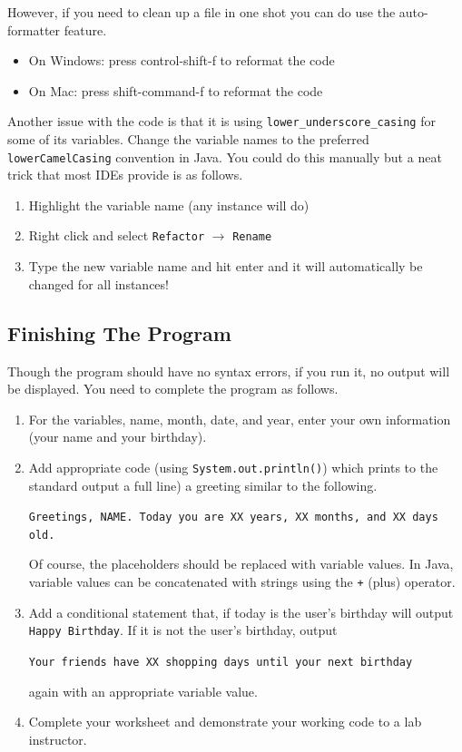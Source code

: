 \documentclass[12pt]{scrartcl}
\begin{document}
However, if you need to clean up a file in one shot you can do use the
auto-formatter feature.  

\begin{itemize}
  \item On Windows: press control-shift-f to reformat the code
  \item On Mac: press shift-command-f to reformat the code
\end{itemize}

Another issue with the code is that it is using \texttt{lower_underscore_casing} for some of its variables.  Change the 
variable names to the preferred \texttt{lowerCamelCasing} 
convention in Java.  You could do this manually but a neat trick that
most IDEs provide is as follows.

\begin{enumerate}
  \item Highlight the variable name (any instance will do)
  \item Right click and select \texttt{Refactor} $\rightarrow$ \texttt{Rename}
  \item Type the new variable name and hit enter and it will automatically be changed for all instances!  
\end{enumerate}

\subsection{Finishing The Program}

Though the program should have no syntax errors, if you run it, no 
output will be displayed.  You need to complete the program as follows.

\begin{enumerate}
  \item For the variables, name, month, date, and year, enter your 
  	own information (your name and your birthday).
  \item Add appropriate code (using \texttt{System.out.println()})
    which prints to the standard output a full line) a greeting similar
    to the following. 
    
    \texttt{Greetings, NAME.  Today you are XX years, 
    XX months, and XX days old.}  
    
    Of course, the placeholders should
    be replaced with variable values.  In Java, variable values can be
    concatenated with strings using the \texttt{+} (plus) 
    operator.
  \item Add a conditional statement that, if today is the user's birthday 
    will output \texttt{Happy Birthday}.  If it is not the 
    user's birthday, output 
    
    \texttt{Your friends have XX shopping days until your next birthday} 
    
    again with an appropriate variable
    value.
  \item Complete your worksheet and demonstrate your working code to a 
  	lab instructor.
\end{enumerate}
\end{document}
